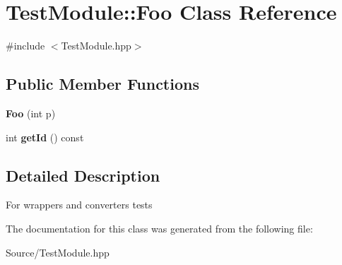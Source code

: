 \hypertarget{class_test_module_1_1_foo}{
\section{TestModule::Foo Class Reference}
\label{class_test_module_1_1_foo}
}


{\ttfamily \#include $<$TestModule.hpp$>$}

\subsection*{Public Member Functions}
\begin{DoxyCompactItemize}
\item 
\hypertarget{class_test_module_1_1_foo_ad774ab638b2aff46d3eaa14c3d35b56c}{
{\bfseries Foo} (int p)}
\label{class_test_module_1_1_foo_ad774ab638b2aff46d3eaa14c3d35b56c}

\item 
\hypertarget{class_test_module_1_1_foo_ac3956b3637da8b11b717ada83e0ac6c0}{
int {\bfseries getId} () const }
\label{class_test_module_1_1_foo_ac3956b3637da8b11b717ada83e0ac6c0}

\end{DoxyCompactItemize}


\subsection{Detailed Description}
For wrappers and converters tests 

The documentation for this class was generated from the following file:\begin{DoxyCompactItemize}
\item 
Source/TestModule.hpp\end{DoxyCompactItemize}

